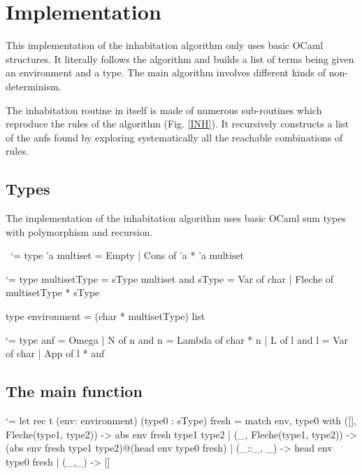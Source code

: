 \documentclass{article}
\let\origlstlisting=\lstlisting
\let\endoriglstlisting=\endlstlisting
\renewenvironment{lstlisting}
{\mathcode`\-=\hyphenmathcode
    \everymath{}\mathsurround=0pt\origlstlisting}
{\endoriglstlisting}
\begin{document}
\section{Implementation}
This implementation of the inhabitation algorithm only uses basic OCaml structures. It literally follows the algorithm and builds a list of terms being given an environment and a type. The main algorithm involves different kinds of non-determinism.

The inhabitation routine in itself  is made of numerous sub-routines which reproduce the rules of the algorithm (Fig. \ref{INH}). It recursively constructs a list of the anfs found by exploring systematically all the reachable combinations of rules.

\subsection{Types}
The implementation of the inhabitation algorithm uses basic OCaml sum types with polymorphism and recursion. 

\
\begin{lstlisting}[caption={Multisets}]
type 'a multiset =
  Empty
| Cons of 'a * 'a multiset
\end{lstlisting}

\begin{lstlisting}[caption={Intersection types and environments}]
type multisetType = 
  sType multiset
and sType = 
  Var of char
| Fleche of multisetType * sType

type environment = (char * multisetType) list
\end{lstlisting}

\begin{lstlisting}[caption={Approximate normal forms}]
type anf = 
  Omega
| N of n
and n = 
  Lambda of char * n
| L of l
and l =
  Var of char
| App of l * anf
\end{lstlisting}


\subsection{The main function}
    
\begin{lstlisting}
let rec t (env: environment) (type0 : sType) fresh =
match env, type0 with
  ([], Fleche(type1, type2)) -> 
        abs env fresh type1 type2
  | (_, Fleche(type1, type2)) -> 
        (abs env fresh type1 type2)@(head env type0 fresh)
  | (_::_, _) -> head env type0 fresh
  | (_,_) -> []
\end{lstlisting}
\end{document}
